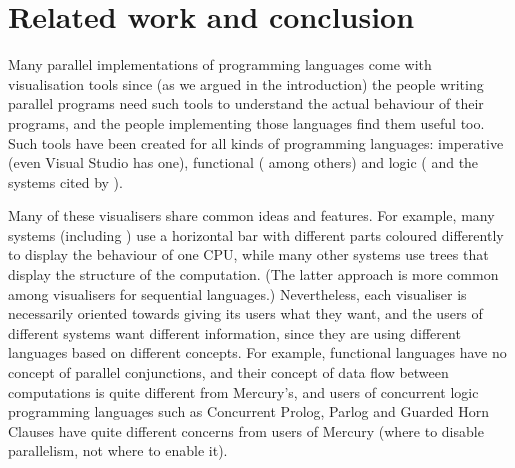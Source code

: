 \section{Related work and conclusion}
\label{sec:tscope_conc}

%
%
%
%


Many parallel implementations of programming languages
come with visualisation tools
since (as we argued in the introduction)
the people writing parallel programs
need such tools to understand the actual behaviour of their programs,
and the people implementing those languages find them useful too.
Such tools have been created for all kinds of programming languages:
imperative (even Visual Studio has one),
functional
(\citet{edentraceviewer,loidl98:gransim,runciman93:profilingparfp} among others)
and logic (\citet{Foster96,vace}
and the systems cited by \citet{Gupta95parallelexecution}).

Many of these visualisers share common ideas and features.
For example, many systems (including \tscope)
use a horizontal bar with different parts coloured differently
to display the behaviour of one CPU,
while many other systems use trees
that display the structure of the computation.
(The latter approach is more common
among visualisers for sequential languages.)
Nevertheless, each visualiser is necessarily oriented
towards giving its users what they want,
and the users of different systems want different information,
since they are using different languages based on different concepts.
For example, functional languages have no concept of parallel conjunctions,
and their concept of data flow between computations
is quite different from Mercury's,
and users of concurrent logic programming languages
such as Concurrent Prolog, Parlog and Guarded Horn Clauses
have quite different concerns from users of Mercury
(where to disable parallelism, not where to enable it).

